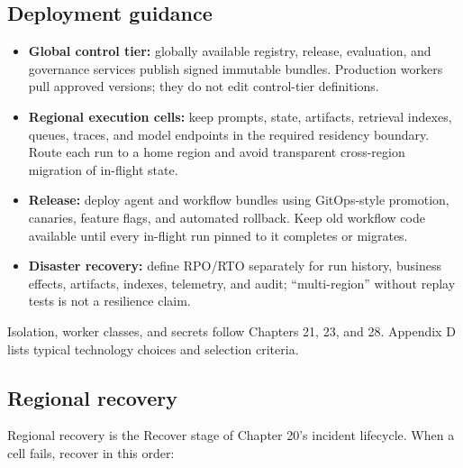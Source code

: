 \subsection{Deployment guidance}

\begin{itemize}

\item \textbf{Global control tier:} globally available registry, release, evaluation, and governance services publish signed immutable bundles. Production workers pull approved versions; they do not edit control-tier definitions.

\item \textbf{Regional execution cells:} keep prompts, state, artifacts, retrieval indexes, queues, traces, and model endpoints in the required residency boundary. Route each run to a home region and avoid transparent cross-region migration of in-flight state.

\item \textbf{Release:} deploy agent and workflow bundles using GitOps-style promotion, canaries, feature flags, and automated rollback. Keep old workflow code available until every in-flight run pinned to it completes or migrates.

\item \textbf{Disaster recovery:} define RPO/RTO separately for run history, business effects, artifacts, indexes, telemetry, and audit; “multi-region” without replay tests is not a resilience claim.

\end{itemize}

Isolation, worker classes, and secrets follow Chapters 21, 23, and 28. Appendix D lists typical technology choices and selection criteria.\par

\subsection{Regional recovery}

Regional recovery is the Recover stage of Chapter 20's incident lifecycle. When a cell fails, recover in this order:\par

